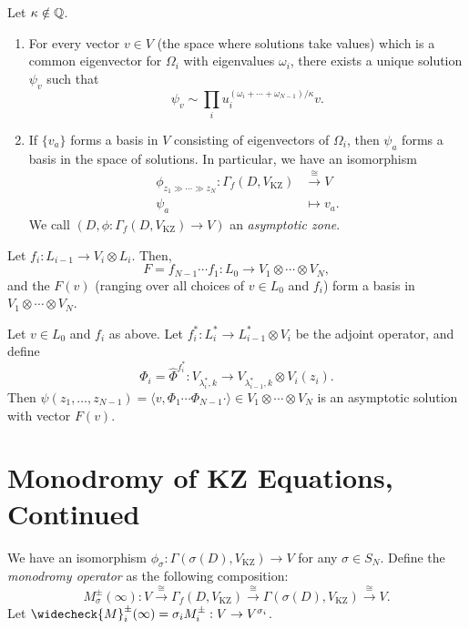 \begin{prop}
  Let $\kappa \notin \mathbb{Q}$.
  \begin{enumerate}
    \item For every vector $v \in V$
      (the space where solutions take values) which is
      a common eigenvector for $\Omega_i$
      with eigenvalues $\omega_i$, there
      exists a unique solution
      $\psi_v$ such that
      \[
        \psi_v \sim \prod_i u_i^{(\omega_i + \cdots + \omega_{N - 1}) / \kappa} v.
      \]
    \item If $\{v_a\}$ forms a basis
      in $V$ consisting of eigenvectors of
      $\Omega_i$, then $\psi_a$ forms a
      basis in the space of solutions.
      In particular, we have an isomorphism
      \begin{align*}
        \phi_{z_1 \gg \cdots \gg z_N}
        : \Gamma_f(D, V_{\mathrm{KZ}})
        &\overset{\cong}{\longrightarrow} V \\
        \psi_a &\longmapsto v_a.
      \end{align*}
      We call $(D, \phi : \Gamma_f(D, V_{\mathrm{KZ}}) \to V)$
      an \emph{asymptotic zone}.
  \end{enumerate}
\end{prop}

\begin{remark}
  Let $f_i : L_{i - 1} \to V_i \otimes L_i$.
  Then,
  \[
    F = f_{N - 1} \cdots f_1
    : L_0 \longrightarrow V_1 \otimes \cdots \otimes V_N,
  \]
  and the $F(v)$ (ranging over all choices of
  $v \in L_0$ and $f_i$)
  form a basis
  in $V_1 \otimes \cdots \otimes V_N$.
\end{remark}

\begin{theorem}
  Let $v \in L_0$ and $f_i$ as above. Let
  $f_i^* : L_i^* \to
    L_{i - 1}^* \otimes V_i$
  be the adjoint operator, and define
  \[
    \Phi_i = \widehat{\Phi}^{f_i^*}
    : V_{\lambda_i^*, k} \longrightarrow
    V_{\lambda_{i - 1}^*, k} \otimes V_i(z_i).
  \]
  Then $\psi(z_1, \dots, z_{N - 1}) = \langle v, \Phi_{1} \cdots \Phi_{N - 1} \cdot \rangle \in V_1 \otimes \cdots \otimes V_N$
  is an asymptotic solution with vector
  $F(v)$.
\end{theorem}

\section{Monodromy of KZ Equations, Continued}

\begin{remark}
  We have an isomorphism
  $\phi_\sigma : \Gamma(\sigma(D), V_{\mathrm{KZ}}) \to V$ for any $\sigma \in S_N$.
  Define the \emph{monodromy operator} as
  the following composition:
  \[
    M^{\pm}_\sigma(\infty)
    : V
    \overset{\cong}{\longrightarrow} \Gamma_f(D, V_{\mathrm{KZ}})
    \overset{\cong}{\longrightarrow} \Gamma(\sigma(D), V_{\mathrm{KZ}})
    \overset{\cong}{\longrightarrow} V.
  \]
  Let $\widecheck{M}^{\pm}_i(\infty) = \sigma_i M^{\pm}_i : V \to V^{\sigma_i}$.
\end{remark}

